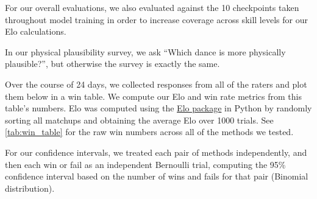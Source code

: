 For our overall evaluations, we also evaluated against the 10 checkpoints taken throughout model training in order to increase coverage across skill levels for our Elo calculations.

In our physical plausibility survey, we ask ``Which dance is more physically plausible?'', but otherwise the survey is exactly the same.

Over the course of 24 days, we collected responses from all of the raters and plot them below in a win table. We compute our Elo and win rate metrics from this table's numbers.
Elo was computed using the \href{https://github.com/ddm7018/Elo}{Elo package} in Python by randomly sorting all matchups and obtaining the average Elo over 1000 trials.
See \cref{tab:win_table} for the raw win numbers across all of the methods we tested.

For our confidence intervals, we treated each pair of methods independently, and then each win or fail as an independent Bernoulli trial, computing the 95\% confidence interval based on the number of wins and fails for that pair (Binomial distribution).

